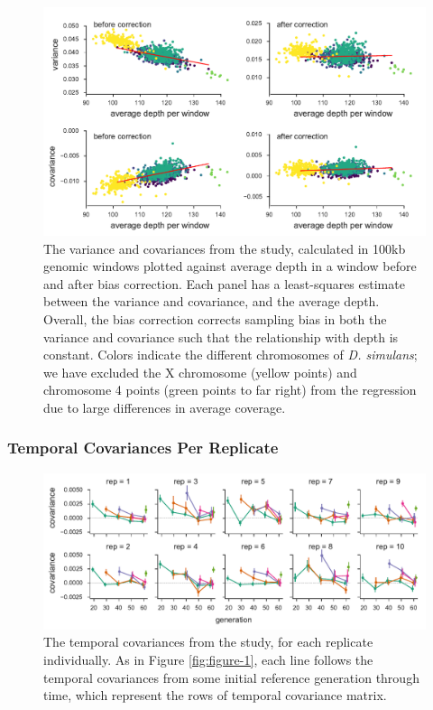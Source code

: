 \documentclass[11pt]{article}
\begin{document}
\begin{figure}[!ht]
  \centering
  \includegraphics[]{figures/barghi-correction-plot.pdf}

  \caption{The variance and covariances from the \textcite{Barghi2019-qy}
    study, calculated in 100kb genomic windows plotted against average depth in
    a window before and after bias correction.  Each panel has a least-squares
    estimate between the variance and covariance, and the average depth.
    Overall, the bias correction corrects sampling bias in both the variance
    and covariance such that the relationship with depth is constant. Colors
    indicate the different chromosomes of \emph{D. simulans}; we have excluded
  the X chromosome (yellow points) and chromosome 4 points (green points to far
right) from the regression due to large differences in average coverage.}

  \label{suppfig:barghi-correction}
\end{figure}

\clearpage

\subsubsection{\textcite{Barghi2019-qy} Temporal Covariances Per Replicate}
\begin{figure}[!ht]
  \centering
  \includegraphics[width=\textwidth]{figures/barghi-cov-panels.pdf}

  \caption{The temporal covariances from the \textcite{Barghi2019-qy} study,
  for each replicate individually. As in Figure \ref{fig:figure-1}, each line
  follows the temporal covariances from some initial reference generation through
  time, which represent the rows of temporal covariance matrix.}

  \label{suppfig:barghi-cov-panels}
\end{figure}
\end{document}
